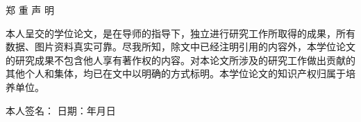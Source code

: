 \documentclass[12pt,a4paper]{article}
\makeatletter
\numberwithin{equation}{section}
\numberwithin{figure}{section}
\numberwithin{table}{section}
\newcommand{\cleardoublepage}{\clearpage\if@twoside\ifodd\c@page\else\hbox{}\thispagestyle{empty}\newpage\if@twocolumn\hbox{}\newpage\fi\fi\fi}%
\newcommand{\heiti}{\CJKfamily{SimHei}}
\makeatother
\begin{document}
\cleardoublepage

\thispagestyle{plain}
\begin{center}
{\heiti\fontsize{18}{22}\selectfont 郑 重 声 明}
\end{center}

\vspace{1cm}

\setlength{\parindent}{2em}

本人呈交的学位论文，是在导师的指导下，独立进行研究工作所取得的成果，所有数据、图片资料真实可靠。尽我所知，除文中已经注明引用的内容外，本学位论文的研究成果不包含他人享有著作权的内容。对本论文所涉及的研究工作做出贡献的其他个人和集体，均已在文中以明确的方式标明。本学位论文的知识产权归属于培养单位。

\vspace{2cm}

\begin{flushright}
本人签名：\underline{\makebox[4.5cm]{}} \qquad 日期：\underline{\makebox[1.5cm]{}}年\underline{\makebox[1.2cm]{}}月\underline{\makebox[1.2cm]{}}日
\end{flushright}

\cleardoublepage

\setcounter{page}{1}

\begin{abstract}
四旋翼无人机在复杂环境中的高速自主避障是机器人领域的核心挑战。端到端视觉避障方法通过深度神经网络直接将传感器输入映射为控制指令，避免了传统模块化方法中感知-建图-规划各环节之间的累积误差。本文围绕"如何设计和优化适用于四旋翼避障的端到端神经网络架构"这一核心问题，对六种基于Mamba的状态空间模型架构进行了系统的比较评估，并结合跨架构知识蒸馏技术从ViT+LSTM教师模型中迁移知识。在Flightmare仿真器的60m障碍赛道上，本文在球体和树木两种环境中开展了多速度评估（5m/s和7m/s），总计完成60+轮训练和数百次仿真测试。

主要发现包括：（1）DecisionMamba（轻量CNN编码器+SSM时序头）以2.19M参数、7.1ms推理速度和1次碰撞实现最优性能——但其优势主要来自CNN编码器保留空间结构后的蒸馏增益，SSM时序头在单帧决策中的独立贡献高度边际化，价值主要体现在高速速度鲁棒性；（2）跨架构蒸馏显著提升性能（B+和E从3次碰撞降至1次，超越教师的2次），且蒸馏后的E distill具有最优控制精度（MAE=0.220，jerk=0.023）；（3）蒸馏成功的核心条件是学生编码器保留空间结构——CNN编码器可通过MSE与ViT特征对齐，而纯SSM编码器因扫描展平空间维度导致对齐完全失败（gt\_loss从0.02升至0.83）；（4）G\_basic（CNN+MLP，0.49M，2.8$\pm$1.3次碰撞）和G\_lstm（CNN+LSTM，~0.8M，4次碰撞）对照实验进一步量化了BC训练在控制质量上的固有局限（MAE追踪误差1.2--1.8，是蒸馏模型的5--8倍）。本文的系统性发现为跨架构知识蒸馏在机器人学习中的应用提供了明确的设计指南和边界条件。

\textbf{关键词：}Mamba；状态空间模型；知识蒸馏；四旋翼飞行器；视觉避障
\end{abstract}
\end{document}

